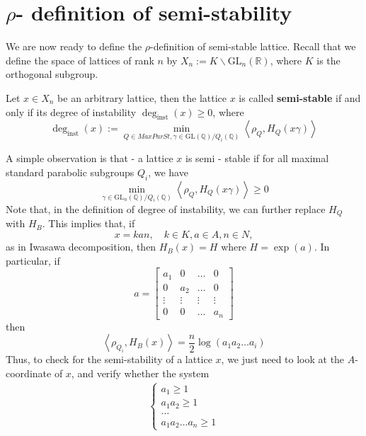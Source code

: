 \section{$\rho$- definition of semi-stability}
We are now ready to define the $\rho$-definition of semi-stable lattice. Recall that
we define the space of lattices of rank $n$ by $X_n := K \backslash \text{GL}_n(\mathbb{R})$, where $K$ is the orthogonal subgroup.
\begin{definition}[\label  = $\rho$-definition]\label{ss2}
    Let $x \in X_n$ be an arbitrary lattice, then the lattice $x$ is called \textbf{semi-stable} if and only if its degree of instability $\deg_{\text{inst}}(x)\ge 0$, where
    \[\deg_{\text{inst}}(x):= \min_{Q \in MaxParSt, \gamma \in \text{GL}(\mathbb{Q})/Q_i(\mathbb{Q})}\left\langle \rho_Q, H_Q(x\gamma) \right\rangle\]
\end{definition}
A simple observation is that - a lattice $x$ is semi - stable if for all maximal standard parabolic subgroups
$Q_i$, we have
\[\min_{\gamma \in \text{GL}_n(\mathbb{Q})/Q_i(\mathbb{Q})}\left\langle \rho_Q, H_Q(x\gamma) \right\rangle \ge 0\]
Note that, in the definition of degree of instability, we can further replace $H_Q$ with $H_B$. This implies that, if
\[ x = kan, \quad k \in K, a \in A, n \in N,\]
as in Iwasawa decomposition, then $H_B(x) = H$ where $H = \exp(a)$. In particular, if
\[a = \begin{bmatrix}
        a_1    & 0      & \ldots & 0      \\
        0      & a_2    & \ldots & 0      \\
        \vdots & \vdots & \vdots & \vdots \\
        0      & 0      & \ldots & a_n
    \end{bmatrix}\]
then
\[\left\langle \rho_{Q_i}, H_B(x) \right\rangle = \dfrac{n}{2}\log(a_1a_2\ldots a_i)\]
Thus, to check for the semi-stability of a lattice $x$, we just need to look at the
$A$-coordinate of $x$, and verify whether the system
\begin{align*}
    \begin{cases}
        a_1 \ge 1   \\
        a_1a_2\ge 1 \\
        \ldots      \\
        a_1a_2\ldots a_n \ge 1
    \end{cases}
\end{align*}
